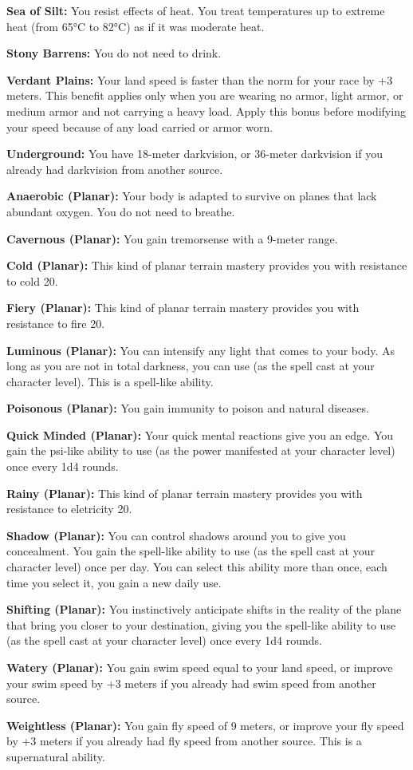 {\textbf{Sea of Silt:} You resist effects of heat. You treat temperatures up to extreme heat (from 65°C to 82°C) as if it was moderate heat.

\textbf{Stony Barrens:} You do not need to drink.

\textbf{Verdant Plains:} Your land speed is faster than the norm for your race by +3 meters. This benefit applies only when you are wearing no armor, light armor, or medium armor and not carrying a heavy load. Apply this bonus before modifying your speed because of any load carried or armor worn.

\textbf{Underground:} You have 18-meter darkvision, or 36-meter darkvision if you already had darkvision from another source.


\textbf{Anaerobic (Planar):} Your body is adapted to survive on planes that lack abundant oxygen. You do not need to breathe.

\textbf{Cavernous (Planar):} You gain tremorsense with a 9-meter range.

\textbf{Cold (Planar):} This kind of planar terrain mastery provides you with resistance to cold 20.

\textbf{Fiery (Planar):} This kind of planar terrain mastery provides you with resistance to fire 20.

\textbf{Luminous (Planar):} You can intensify any light that comes to your body. As long as you are not in total darkness, you can use  (as the spell cast at your character level). This is a spell-like ability.

\textbf{Poisonous (Planar):} You gain immunity to poison and natural diseases.

\textbf{Quick Minded (Planar):} Your quick mental reactions give you an edge. You gain the psi-like ability to use  (as the power manifested at your character level) once every 1d4 rounds.

\textbf{Rainy (Planar):} This kind of planar terrain mastery provides you with resistance to eletricity 20.

\textbf{Shadow (Planar):} You can control shadows around you to give you concealment. You gain the spell-like ability to use  (as the spell cast at your character level) once per day. You can select this ability more than once, each time you select it, you gain a new daily use.

\textbf{Shifting (Planar):} You instinctively anticipate shifts in the reality of the plane that bring you closer to your destination, giving you the spell-like ability to use  (as the spell cast at your character level) once every 1d4 rounds.

\textbf{Watery (Planar):} You gain swim speed equal to your land speed, or improve your swim speed by +3 meters if you already had swim speed from another source.

\textbf{Weightless (Planar):} You gain fly speed of 9 meters, or improve your fly speed by +3 meters if you already had fly speed from another source. This is a supernatural ability.

}

